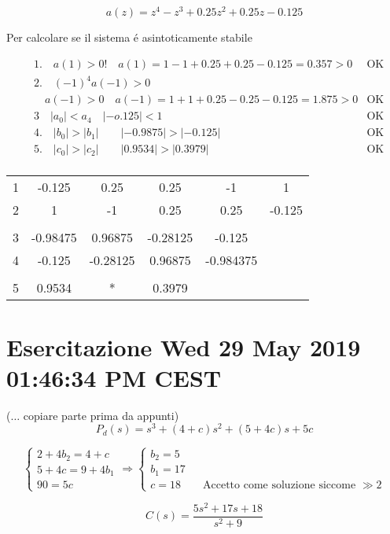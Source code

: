\documentclass{article}
\begin{document}
\[ a(z) = z^4 - z^3 + 0.25 z^2 + 0.25 z - 0.125 \]

Per calcolare se il sistema \'e asintoticamente stabile

\begin{align*}
    &1.\quad  a(1) > 0! \quad a(1) = 1 -1 + 0.25 + 0.25 - 0.125 = 0.357 > 0 & \text{OK}\\
    &2. \quad (-1) ^4 a(-1) > 0 \\
    & \quad a(-1) > 0 \quad a(-1) = 1 + 1 + 0.25 - 0.25 -0.125 = 1.875 > 0 & \text{OK}\\
    &3 \quad |a_0| < a_4 \quad |-o.125| < 1 & \text{OK} \\
    & 4. \quad |b_0| > |b_1| \qquad |-0.9875| > |-0.125| & \text{OK}\\
    & 5.\quad  |c_0| > |c_2| \qquad |0.9534| > |0.3979| & \text{OK}\\
\end{align*}

\begin{tabular}{c|c c c c c}
    1 & -0.125 & 0.25 & 0.25 & -1 & 1\\
    2 & 1 & -1 & 0.25 & 0.25 & -0.125\\
    \\
    3 & -0.98475 & 0.96875 & -0.28125 & -0.125\\
    4 & -0.125 & -0.28125 & 0.96875 & -0.984375\\
    \\
    5 & 0.9534 & * & 0.3979
\end{tabular}
\newpage
\section{Esercitazione Wed 29 May 2019 01:46:34 PM CEST}

($\ldots$ copiare parte prima da appunti)
\[ P_d (s) = s^3 + (4+c) s^2 + (5+4c)s + 5c \]

\[
\begin{cases}
2 + 4b_2 = 4+c\\
5 + 4c = 9+4b_1\\
90 = 5c
\end{cases}
\Rightarrow
\begin{cases}
b_2 = 5\\
b_1=17\\
c=18 \qquad \text{Accetto come soluzione siccome $\gg 2$}
\end{cases}
\]

\[
    C(s) = \frac{5s^2 + 17s + 18}{s^2 + 9}
\]
\end{document}
